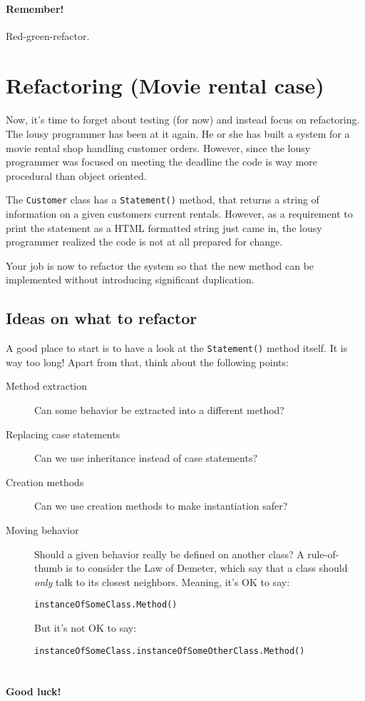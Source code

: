 \documentclass{article}
\begin{document}
      \paragraph{ Remember! }
        Red-green-refactor.







\pagebreak
\section{ Refactoring (Movie rental case) }
  \paragraph{}
  Now, it's time to forget about testing (for now) and instead focus on refactoring. The lousy programmer has been at it again. He or she has built a system for a movie rental shop handling customer orders. However, since the lousy programmer was focused on meeting the deadline the code is way more procedural than object oriented.
  
  The \texttt{Customer} class has a \texttt{Statement()} method, that returns a string of information on a given customers current rentals. However, as a requirement to print the statement as a HTML formatted string just came in, the lousy programmer realized the code is not at all prepared for change.
  
  Your job is now to refactor the system so that the new method can be implemented without introducing significant duplication.

  \subsection*{Ideas on what to refactor}
  A good place to start is to have a look at the \texttt{Statement()} method itself. It is way too long! Apart from that, think about the following points:

  \begin{description}
    \item[Method extraction] Can some behavior be extracted into a different method?
    \item[Replacing case statements] Can we use inheritance instead of case statements?
    \item[Creation methods] Can we use creation methods to make instantiation safer?
    \item[Moving behavior] Should a given behavior really be defined on another class? A rule-of-thumb is to consider the Law of Demeter, which say that a class should \emph{only} talk to its closest neighbors. Meaning, it's OK to say:

    \texttt{instanceOfSomeClass.Method()}

    But it's not OK to say:
    
    \texttt{instanceOfSomeClass.instanceOfSomeOtherClass.Method()}
  \end{description}


\section*{}
  \paragraph{ Good luck! }
\end{document}
